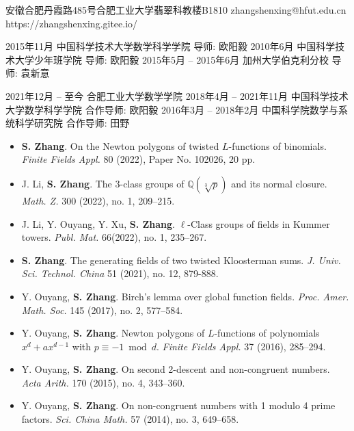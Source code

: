 \documentclass[11pt,a4paper]{article}
\begin{document}
  {安徽合肥丹霞路485号合肥工业大学翡翠科教楼B1810}
  {zhangshenxing@hfut.edu.cn}
  {https://zhangshenxing.gitee.io/}


\begin{enumerate}
  {2015年11月}
  {中国科学技术大学数学科学学院}
  {导师: 欧阳毅}
  {2010年6月}
  {中国科学技术大学少年班学院}
  {导师: 欧阳毅}
  {2015年5月 -- 2015年6月}
  {加州大学伯克利分校}
  {导师: 袁新意}
\end{enumerate}


\begin{enumerate}
  {2021年12月 -- 至今}
  {合肥工业大学数学学院}
  {}
  {2018年4月 -- 2021年11月}
  {中国科学技术大学数学科学学院}
  {合作导师: 欧阳毅}
  {2016年3月 -- 2018年2月}
  {中国科学院数学与系统科学研究院}
  {合作导师: 田野}
\end{enumerate}


\begin{itemize}
\item \textbf{S. Zhang}.
On the Newton polygons of twisted $L$-functions of binomials.
{\em Finite Fields Appl.} 80 (2022), Paper No. 102026, 20 pp.

\item J. Li, \textbf{S. Zhang}.
The $3$-class groups of $\mathbb{Q}(\sqrt[3]{p})$ and its normal closure.
{\em Math. Z.} 300 (2022), no. 1, 209--215.

\item J. Li, Y. Ouyang, Y. Xu, \textbf{S. Zhang}.
$\ell$-Class groups of fields in Kummer towers.
{\em Publ. Mat.} 66(2022), no. 1, 235--267.

\item \textbf{S. Zhang}.
The generating fields of two twisted Kloosterman sums.
{\em J. Univ. Sci. Technol. China} 51 (2021), no. 12, 879-888.

\item Y. Ouyang, \textbf{S. Zhang}.
Birch's lemma over global function fields.
{\em Proc. Amer. Math. Soc.} 145 (2017), no. 2, 577--584.

\item Y. Ouyang, \textbf{S. Zhang}.
Newton polygons of $L$-functions of polynomials $x^d+ax^{d-1}$ with $p\equiv -1 \bmod d$.
{\em Finite Fields Appl.} 37 (2016), 285--294.

\item Y. Ouyang, \textbf{S. Zhang}.
On second 2-descent and non-congruent numbers.
{\em Acta Arith.} 170 (2015), no. 4, 343--360.

\item Y. Ouyang, \textbf{S. Zhang}.
On non-congruent numbers with 1 modulo 4 prime factors.
{\em Sci. China Math.} 57 (2014), no. 3, 649--658.
\end{itemize}
\end{document}
